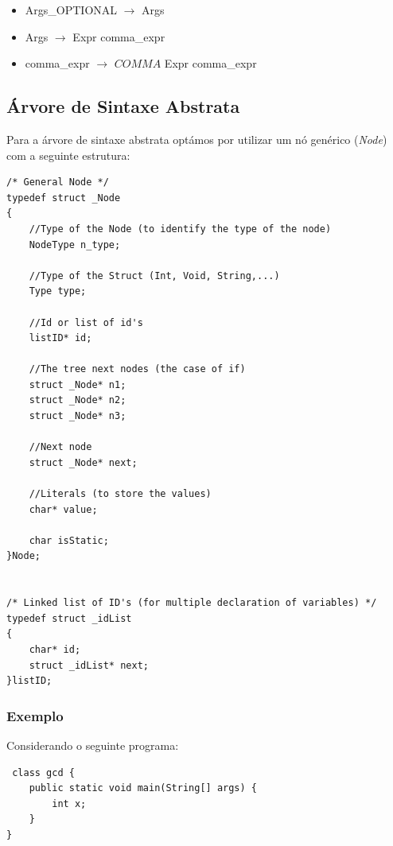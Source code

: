 \documentclass[12pt]{article}
\begin{document}
\begin{itemize}
  \item[] Args\_OPTIONAL $\longrightarrow$ Args
  \\
  \item[] Args $\longrightarrow$ Expr comma\_expr
  \\
  \item[] comma\_expr $\longrightarrow$ $COMMA$ Expr comma\_expr               
  
  
\end{itemize}


\subsection{Árvore de Sintaxe Abstrata}

Para a árvore de sintaxe abstrata optámos por utilizar um nó genérico (\emph{Node}) com a  seguinte estrutura: 

\begin{lstlisting}
/* General Node */
typedef struct _Node
{
    //Type of the Node (to identify the type of the node)
	NodeType n_type;

    //Type of the Struct (Int, Void, String,...)
	Type type;

    //Id or list of id's
    listID* id;

    //The tree next nodes (the case of if)
    struct _Node* n1;
    struct _Node* n2;
    struct _Node* n3;

    //Next node
    struct _Node* next;

    //Literals (to store the values)
    char* value;

    char isStatic;
}Node;


/* Linked list of ID's (for multiple declaration of variables) */
typedef struct _idList
{
	char* id;
	struct _idList* next;
}listID;

\end{lstlisting}
 

\subsubsection{Exemplo}
Considerando o seguinte programa:


\begin{lstlisting}
 class gcd {
 	public static void main(String[] args) {
    	int x;
	} 		
}
\end{lstlisting}
\end{document}
